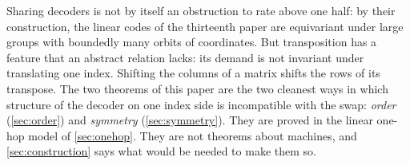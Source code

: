 Sharing decoders is not by itself an obstruction to rate above one half: by their construction, the linear codes of
the thirteenth paper are equivariant under large groups with boundedly many orbits of coordinates. But transposition has a feature that an
abstract relation lacks: its demand is not invariant under translating one index. Shifting the columns of a matrix
shifts the rows of its transpose. The two theorems of this paper are the two cleanest ways in which structure of the
decoder on one index side is incompatible with the swap: \emph{order} (\cref{sec:order}) and \emph{symmetry}
(\cref{sec:symmetry}). They are proved in the linear one-hop model of \cref{sec:onehop}. They are not theorems about
machines, and \cref{sec:construction} says what would be needed to make them so.
